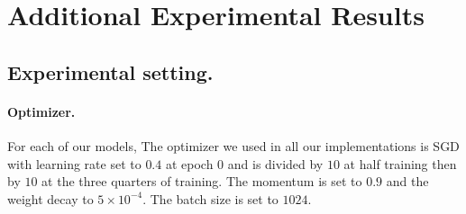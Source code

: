 




\section{Additional Experimental Results}
\label{sec:additional-xp}

\subsection{Experimental setting.}


\paragraph{Optimizer.} For each of our models, The optimizer we used in all our implementations is SGD with learning rate set to $0.4$ at epoch $0$ and is divided by $10$ at half training then by $10$ at the three quarters of training. The momentum is set to $0.9$ and the weight decay to $5\times10^{-4}$. The batch size is set to $1024$. 
